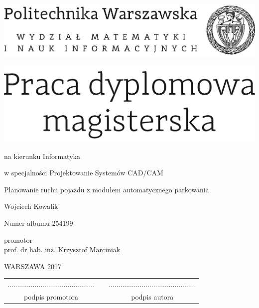 \documentclass[12pt,twoside,a4paper]{article}
\newcommand{\discipline}{Informatyka}
\newcommand{\spec}{Projektowanie Systemów CAD/CAM}
\renewcommand{\title}{Planowanie ruchu pojazdu z modułem automatycznego parkowania}
\renewcommand{\author}{Wojciech Kowalik}
\newcommand{\supervisor}{prof. dr hab. inż. Krzysztof Marciniak}
\newcommand{\album}{254199}
\renewcommand{\year}{2017}
\begin{document}
\pagestyle{empty}

\begin{center}
\includegraphics[scale=1.]{politechnika} 
\vspace{70pt}


\includegraphics[scale=1.]{praca_mgr} %

{ \arial na kierunku \discipline

\arial w specjalności \spec

\vspace{40pt}
{\arial \large \title}

\vspace{50pt}

{\arial \huge \author}

\vspace{5pt}

Numer albumu \album

\vspace{40pt}

promotor \\
{\arial \supervisor}

\vspace{15pt}
 

 \vfill
WARSZAWA \year \\
}
\end{center}


\newpage
\null

\vfill

\begin{center}
\begin{tabular}[t]{ccc}
............................................. & \hspace*{100pt} & .............................................\\
podpis promotora & \hspace*{100pt} & podpis autora
\end{tabular}
\end{center}
\end{document}
